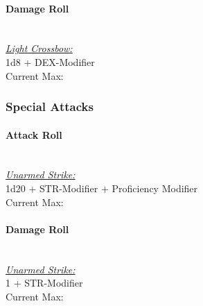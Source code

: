 {\paragraph*{Damage Roll}\hfill\\
\underline{\textit{Light Crossbow:}}\\
1d8 + DEX-Modifier\\
\indent Current Max: 
\subsubsection*{Special Attacks}
\paragraph*{Attack Roll}\hfill\\
\underline{\textit{Unarmed Strike:}}\\
1d20 + STR-Modifier + Proficiency Modifier\\
\indent Current Max: 
\paragraph*{Damage Roll}\hfill\\
\underline{\textit{Unarmed Strike:}}\\
1 + STR-Modifier\\
\indent Current Max: 
}